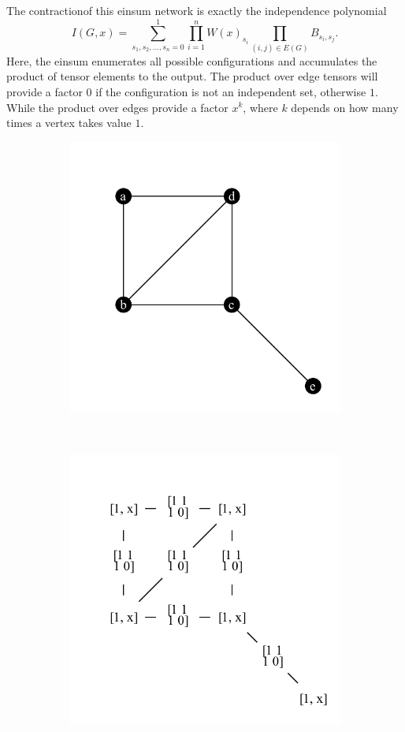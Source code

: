 \documentclass{article}
\newcommand{\<}{\langle}
\renewcommand{\>}{\rangle}
\theoremstyle{definition}\newtheorem{definition}{\textit{Definition}}
\begin{document}
The contractionof this einsum network is exactly the independence polynomial %
\begin{equation}
    I(G, x) = \sum\limits_{s_1, s_2, \ldots, s_n = 0}^{1} \prod\limits_{i=1}^n W(x)_{s_i} \prod\limits_{(i,j) \in E(G)} B_{s_i, s_j}.
\end{equation}
Here, the einsum enumerates all possible configurations and accumulates the product of tensor elements to the output. The product over edge tensors will provide a factor $0$ if the configuration is not an independent set, otherwise $1$.
While the product over edges provide a factor $x^k$, where $k$ depends on how many times a vertex takes value $1$.
\begin{figure}[t!]
    \centering
    \begin{subfigure}[t]{0.4\textwidth}
        \centering
        \centerline{\includegraphics[width=0.8\columnwidth,trim={0 0cm 0 0},clip]{../notebooks/fig1.pdf}}
        \caption{}
    \end{subfigure}%
    ~
    \begin{subfigure}[t]{0.4\textwidth}
        \centering
    \centerline{\includegraphics[width=0.8\columnwidth,trim={0 0cm 0 0},clip]{../notebooks/fig2.pdf}}

\end{subfigure}
\end{figure}
\end{document}
